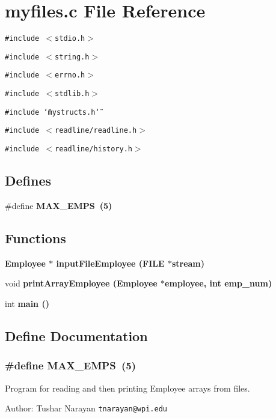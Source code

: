 \section{myfiles.c File Reference}
\label{myfiles_8c}
{\tt \#include $<$stdio.h$>$}\par
{\tt \#include $<$string.h$>$}\par
{\tt \#include $<$errno.h$>$}\par
{\tt \#include $<$stdlib.h$>$}\par
{\tt \#include \char`\"{}mystructs.h\char`\"{}}\par
{\tt \#include $<$readline/readline.h$>$}\par
{\tt \#include $<$readline/history.h$>$}\par
\subsection*{Defines}
\begin{CompactItemize}
\item 
\#define \bf{MAX\_\-EMPS}~(5)
\end{CompactItemize}
\subsection*{Functions}
\begin{CompactItemize}
\item 
\bf{Employee} $\ast$ \bf{input\-File\-Employee} (FILE $\ast$stream)
\item 
void \bf{print\-Array\-Employee} (\bf{Employee} $\ast$employee, int emp\_\-num)
\item 
int \bf{main} ()
\end{CompactItemize}


\subsection{Define Documentation}
\subsubsection{\setlength{\rightskip}{0pt plus 5cm}\#define MAX\_\-EMPS~(5)}\label{myfiles_8c_af3ea086c060fa4c629b13feb44c8d87}


Program for reading and then printing Employee arrays from files. \begin{Desc}
\item[Author:]Tushar Narayan \tt{tnarayan@wpi.edu} \end{Desc}


